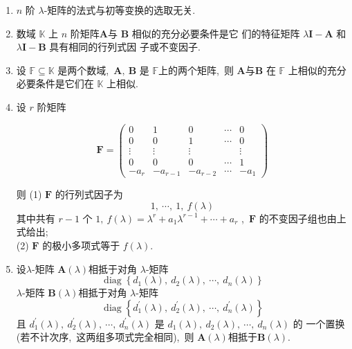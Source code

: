 \begin{enumerate}
		\item  $n $ 阶  $\lambda $-矩阵的法式与初等变换的选取无关.
		\item 数域 $ \mathbb{K}$  上 $ n$  阶矩阵$  \boldsymbol{A}  $与  $\boldsymbol{B} $ 相似的充分必要条件是它 们的特征矩阵 $ \lambda \boldsymbol{I}-\boldsymbol{A} $ 和  $\lambda \boldsymbol{I}-\boldsymbol{B} $ 具有相同的行列式因 子或不变因子.
		\item 设  $\mathbb{F} \subseteq \mathbb{K} $ 是两个数域,\   $\boldsymbol{A},\ \boldsymbol{B}$  是  $\mathbb{F}  $上的两个矩阵,\  则  $\boldsymbol{A}  $与$\boldsymbol{B}$  在  $\mathbb{F} $ 上相似的充分必要条件是它们在 $ \mathbb{K} $ 上相似.
		\item 设 $ r$  阶矩阵
		
		$$\boldsymbol{F}=\left(\begin{array}{ccccc}
			0 & 1 & 0 & \cdots & 0 \\
			0 & 0 & 1 & \cdots & 0 \\
			\vdots & \vdots & \vdots & & \vdots \\
			0 & 0 & 0 & \cdots & 1 \\
			-a_{r} & -a_{r-1} & -a_{r-2} & \cdots & -a_{1}
		\end{array}\right)$$
		
		则
		(1) $ \boldsymbol{F} $ 的行列式因子为
		$$1,\  \cdots,\  1,\  f(\lambda)$$
		其中共有  $r-1 $ 个 $ 1,\  f(\lambda)=\lambda^{r}+a_{1} \lambda^{r-1}+\cdots+a_{r}$ ,\   $\boldsymbol{F} $ 的不变因子组也由上式给出;\\
		(2) $ \boldsymbol{F} $ 的极小多项式等于 $ f(\lambda) .$
		\item 设$  \lambda $-矩阵  $\boldsymbol{A}(\lambda)  $相抵于对角  $\lambda $-矩阵
		$$\operatorname{diag}\left\{d_{1}(\lambda),\  d_{2}(\lambda),\  \cdots,\  d_{n}(\lambda)\right\}$$
		$\lambda $-矩阵 $ \boldsymbol{B}(\lambda)  $相抵于对角 $ \lambda $-矩阵
		$$\operatorname{diag}\left\{d_{1}^{\prime}(\lambda),\  d_{2}^{\prime}(\lambda),\  \cdots,\  d_{n}^{\prime}(\lambda)\right\}$$
		且  $d_{1}^{\prime}(\lambda),\  d_{2}^{\prime}(\lambda),\  \cdots,\  d_{n}^{\prime}(\lambda) $ 是 $ d_{1}(\lambda),\  d_{2}(\lambda),\  \cdots,\  d_{n}(\lambda) $ 的 一个置换 (若不计次序,\  这两组多项式完全相同),\  则  $\boldsymbol{A}(\lambda)  $相抵于$  \boldsymbol{B}(\lambda) .$
		

\end{enumerate}
